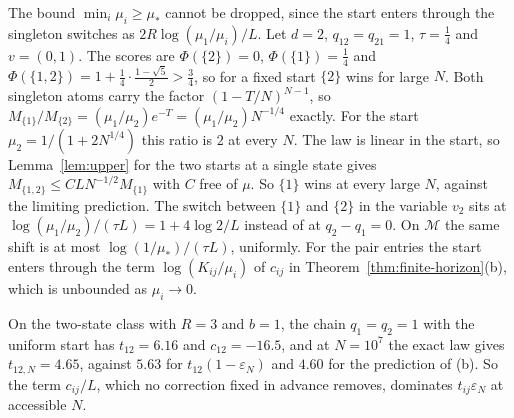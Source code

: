 \begin{remark}\label{rem:finite-start}
The bound $\min_i\mu_i\ge\mu_*$ cannot be dropped, since the start enters through the singleton
switches as $2R\log(\mu_1/\mu_i)/L$. Let $d=2$, $q_{12}=q_{21}=1$, $\tau=\frac14$ and $v=(0,1)$.
The scores are $\Phi(\{2\})=0$, $\Phi(\{1\})=\frac14$ and
$\Phi(\{1,2\})=1+\frac14\cdot\frac{1-\sqrt5}2>\frac34$, so for a fixed start $\{2\}$ wins for large
$N$. Both singleton atoms carry the factor $(1-T/N)^{N-1}$, so
$M_{\{1\}}/M_{\{2\}}=(\mu_1/\mu_2)e^{-T}=(\mu_1/\mu_2)N^{-1/4}$ exactly. For the start
$\mu_2=1/(1+2N^{1/4})$ this ratio is $2$ at every $N$. The law is linear in the start, so
Lemma~\ref{lem:upper} for the two starts at a single state gives
$M_{\{1,2\}}\le CLN^{-1/2}M_{\{1\}}$ with $C$ free of $\mu$. So $\{1\}$
wins at every large $N$, against the limiting prediction. The switch between $\{1\}$ and $\{2\}$ in
the variable $v_2$ sits at $\log(\mu_1/\mu_2)/(\tau L)=1+4\log2/L$ instead of at $q_2-q_1=0$. On
$\mathcal M$ the same shift is at most $\log(1/\mu_*)/(\tau L)$, uniformly. For the pair
entries the start enters through the term $\log(K_{ij}/\mu_i)$ of $c_{ij}$ in
Theorem~\ref{thm:finite-horizon}(b), which is unbounded as $\mu_i\to0$.
\end{remark}

\begin{remark}\label{rem:finite-size}
On the two-state class with $R=3$ and $b=1$, the chain $q_1=q_2=1$ with the uniform start has
$t_{12}=6.16$ and $c_{12}=-16.5$, and at $N=10^7$ the exact law gives $t_{12,N}=4.65$, against
$5.63$ for $t_{12}(1-\varepsilon_N)$ and $4.60$ for the prediction of (b). So the term
$c_{ij}/L$, which no correction fixed in advance removes, dominates $t_{ij}\varepsilon_N$ at
accessible $N$.
\end{remark}
